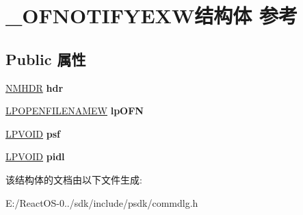 \hypertarget{struct___o_f_n_o_t_i_f_y_e_x_w}{}\section{\+\_\+\+O\+F\+N\+O\+T\+I\+F\+Y\+E\+X\+W结构体 参考}
\label{struct___o_f_n_o_t_i_f_y_e_x_w}
\subsection*{Public 属性}
\begin{DoxyCompactItemize}
\item 
\mbox{\label{struct___o_f_n_o_t_i_f_y_e_x_w_ad7aeae12258bb8980d696a11ab9416c5}} 
\hyperlink{structtag_n_m_h_d_r}{N\+M\+H\+DR} {\bfseries hdr}
\item 
\mbox{\label{struct___o_f_n_o_t_i_f_y_e_x_w_acd76a80b0c3f409ce3d01479d390f499}} 
\hyperlink{structtag_o_f_n_w}{L\+P\+O\+P\+E\+N\+F\+I\+L\+E\+N\+A\+M\+EW} {\bfseries lp\+O\+FN}
\item 
\mbox{\label{struct___o_f_n_o_t_i_f_y_e_x_w_acb55f6654a0147dec0f05736ea98433e}} 
\hyperlink{interfacevoid}{L\+P\+V\+O\+ID} {\bfseries psf}
\item 
\mbox{\label{struct___o_f_n_o_t_i_f_y_e_x_w_aa359acbd45bde41c3a6b9a50da1dc7b3}} 
\hyperlink{interfacevoid}{L\+P\+V\+O\+ID} {\bfseries pidl}
\end{DoxyCompactItemize}


该结构体的文档由以下文件生成\+:\begin{DoxyCompactItemize}
\item 
E\+:/\+React\+O\+S-\/0../sdk/include/psdk/commdlg.\+h\end{DoxyCompactItemize}
